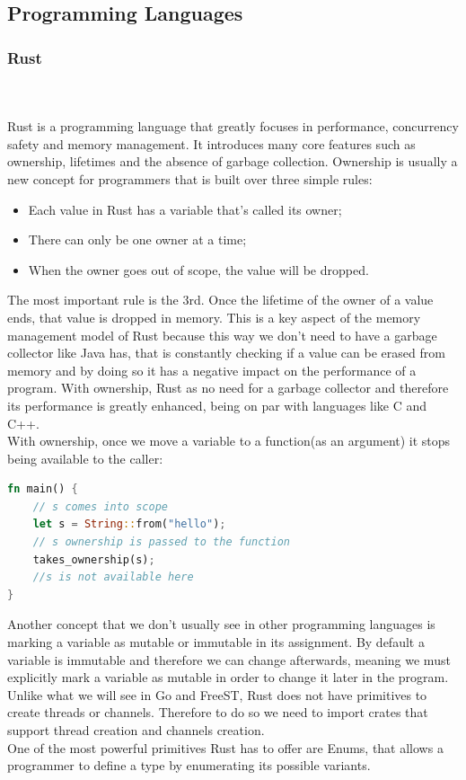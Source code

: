\documentclass[runningheads]{llncs}
\begin{document}
\subsection{Programming Languages}
\subsubsection{Rust}\hfill\\\\
Rust is a programming language that greatly focuses in performance, concurrency safety and memory management.
It introduces many core features such as ownership, lifetimes and the absence of garbage collection.
Ownership is usually a new concept for programmers that is built over three simple rules:
\begin{itemize}
\item Each value in Rust has a variable that’s called its owner;
\item There can only be one owner at a time;
\item When the owner goes out of scope, the value will be dropped.
\end{itemize}
The most important rule is the 3rd. Once the lifetime of the owner of a value ends, that value is dropped in memory. This is a key aspect of the memory management model of Rust because this way we don't need to have a garbage collector like Java has, that is constantly checking if a value can be erased from memory and by doing so it has a negative impact on the performance of a program. With ownership, Rust as no need for a garbage collector and therefore its performance is greatly enhanced, being on par with languages like C and C++.\\
With ownership, once we move a variable to a function(as an argument) it stops being available to the caller:
\begin{lstlisting}[language=Rust]
fn main() {
	// s comes into scope
    let s = String::from("hello");
	// s ownership is passed to the function
    takes_ownership(s);   
    //s is not available here
}
\end{lstlisting}
Another concept that we don't usually see in other programming languages is marking a variable as mutable or immutable in its assignment. By default a variable is immutable and therefore we can change afterwards, meaning we must explicitly mark a variable as mutable in order to change it later in the program.\\
Unlike what we will see in Go and FreeST, Rust does not have primitives to create threads or channels. Therefore to do so we need to import crates that support thread creation and channels creation.\\
One of the most powerful primitives Rust has to offer are Enums, that allows a programmer to define a type by enumerating its possible variants.
\end{document}
